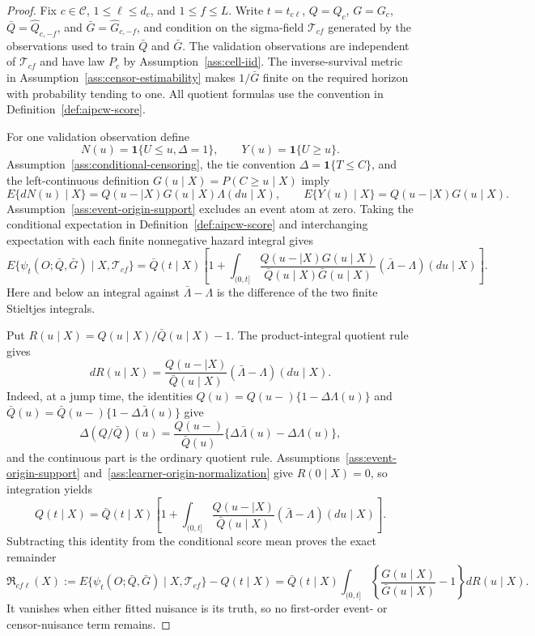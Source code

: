 \documentclass{article}
\begin{document}
\begin{proof}
Fix \(c\in\mathcal C\), \(1\le\ell\le d_c\), and \(1\le f\le L\). Write \(t=t_{c\ell}\), \(Q=Q_c\), \(G=G_c\), \(\bar Q=\widehat Q_{c,-f}\), and \(\bar G=\widehat G_{c,-f}\), and condition on the sigma-field \(\mathcal T_{cf}\) generated by the observations used to train \(\bar Q\) and \(\bar G\). The validation observations are independent of \(\mathcal T_{cf}\) and have law \(P_c\) by Assumption~\ref{ass:cell-iid}. The inverse-survival metric in Assumption~\ref{ass:censor-estimability} makes \(1/\bar G\) finite on the required horizon with probability tending to one. All quotient formulas use the convention in Definition~\ref{def:aipcw-score}.

For one validation observation define
\[
 N(u)=\mathbf 1\{U\le u,\Delta=1\},
 \qquad
 Y(u)=\mathbf 1\{U\ge u\}.
\]
Assumption~\ref{ass:conditional-censoring}, the tie convention \(\Delta=\mathbf 1\{T\le C\}\), and the left-continuous definition \(G(u\mid X)=P(C\ge u\mid X)\) imply
\[
 E\{dN(u)\mid X\}=Q(u-\mid X)G(u\mid X)\Lambda(du\mid X),
 \qquad
 E\{Y(u)\mid X\}=Q(u-\mid X)G(u\mid X).
\]
Assumption~\ref{ass:event-origin-support} excludes an event atom at zero. Taking the conditional expectation in Definition~\ref{def:aipcw-score} and interchanging expectation with each finite nonnegative hazard integral gives
\[
 E\{\psi_t(O;\bar Q,\bar G)\mid X,\mathcal T_{cf}\}
 =\bar Q(t\mid X)\left[1+\int_{(0,t]}
 \frac{Q(u-\mid X)G(u\mid X)}{\bar Q(u\mid X)\bar G(u\mid X)}
 (\bar\Lambda-\Lambda)(du\mid X)\right].
\]
Here and below an integral against \(\bar\Lambda-\Lambda\) is the difference of the two finite Stieltjes integrals.

Put \(R(u\mid X)=Q(u\mid X)/\bar Q(u\mid X)-1\). The product-integral quotient rule gives
\[
 dR(u\mid X)=\frac{Q(u-\mid X)}{\bar Q(u\mid X)}
 (\bar\Lambda-\Lambda)(du\mid X).
\]
Indeed, at a jump time, the identities
\(Q(u)=Q(u-)\{1-\Delta\Lambda(u)\}\) and
\(\bar Q(u)=\bar Q(u-)\{1-\Delta\bar\Lambda(u)\}\) give
\[
 \Delta(Q/\bar Q)(u)=\frac{Q(u-)}{\bar Q(u)}
 \{\Delta\bar\Lambda(u)-\Delta\Lambda(u)\},
\]
and the continuous part is the ordinary quotient rule. Assumptions~\ref{ass:event-origin-support} and~\ref{ass:learner-origin-normalization} give \(R(0\mid X)=0\), so integration yields
\[
 Q(t\mid X)=\bar Q(t\mid X)\left[1+\int_{(0,t]}
 \frac{Q(u-\mid X)}{\bar Q(u\mid X)}
 (\bar\Lambda-\Lambda)(du\mid X)\right].
\]
Subtracting this identity from the conditional score mean proves the exact remainder
\[
 \mathfrak R_{cf\ell}(X)
 :=E\{\psi_t(O;\bar Q,\bar G)\mid X,\mathcal T_{cf}\}-Q(t\mid X)
 =\bar Q(t\mid X)\int_{(0,t]}
 \left\{\frac{G(u\mid X)}{\bar G(u\mid X)}-1\right\}
 dR(u\mid X).
\]
It vanishes when either fitted nuisance is its truth, so no first-order event- or censor-nuisance term remains.


\end{proof}
\end{document}
